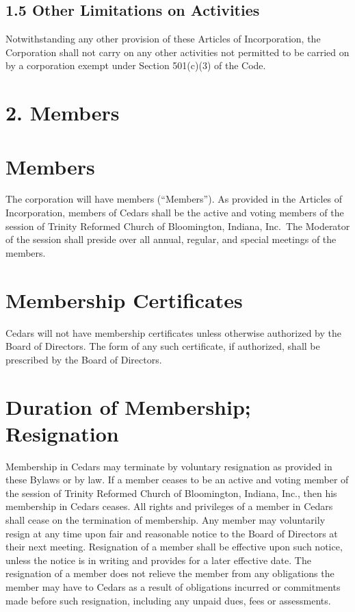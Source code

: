 \documentclass[
]{book}
\begin{document}
\subsection{1.5 Other Limitations on Activities}\label{other-limitations-on-activities}

Notwithstanding any other provision of these Articles of Incorporation, the Corporation shall not carry on any other activities not permitted to be carried on by a corporation exempt under Section 501(c)(3) of the Code.

\section{2. Members}\label{members}

\section{Members}\label{members-1}

The corporation will have members (``Members''). As provided in the Articles of Incorporation, members of Cedars shall be the active and voting members of the session of Trinity Reformed Church of Bloomington, Indiana, Inc.~The Moderator of the session shall preside over all annual, regular, and special meetings of the members.

\section{Membership Certificates}\label{membership-certificates}

Cedars will not have membership certificates unless otherwise authorized by the Board of Directors. The form of any such certificate, if authorized, shall be prescribed by the Board of Directors.

\section{Duration of Membership; Resignation}\label{duration-of-membership-resignation}

Membership in Cedars may terminate by voluntary resignation as provided in these Bylaws or by law. If a member ceases to be an active and voting member of the session of Trinity Reformed Church of Bloomington, Indiana, Inc., then his membership in Cedars ceases. All rights and privileges of a member in Cedars shall cease on the
termination of membership. Any member may voluntarily resign at any
time upon fair and reasonable notice to the Board of Directors at
their next meeting. Resignation of a member shall be effective upon
such notice, unless the notice is in writing and provides for a later
effective date. The resignation of a member does not relieve the
member from any obligations the member may have to Cedars as a result
of obligations incurred or commitments made before such resignation,
including any unpaid dues, fees or assessments.
\end{document}
